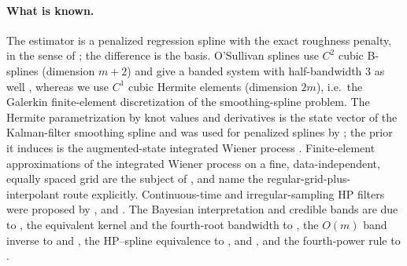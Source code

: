 \documentclass[11pt,a4paper]{article}
\theoremstyle{definition}
\theoremstyle{remark}
\begin{document}
\paragraph{What is known.} The estimator is a penalized regression spline with the exact roughness penalty, in the sense of \citet{OSullivan1986}; the difference is the basis. O'Sullivan splines use $C^2$ cubic B-splines (dimension $m+2$) and give a banded system with half-bandwidth $3$ as well \citep{WandOrmerod2008,Wood2017ps}, whereas we use $C^1$ cubic Hermite elements (dimension $2m$), i.e.\ the Galerkin finite-element discretization of the smoothing-spline problem. The Hermite parametrization by knot values and derivatives is the state vector of the Kalman-filter smoothing spline \citep{WeckerAnsley1983,KohnAnsley1987} and was used for penalized splines by \citet{CostaShaw2009}; the prior it induces is the augmented-state integrated Wiener process \citep{RueHeld2005,LindgrenRue2008}. Finite-element approximations of the integrated Wiener process on a fine, data-independent, equally spaced grid are the subject of \citet{ZhangStringerBrownStafford2024}, and \citet{LindgrenRue2008} name the regular-grid-plus-interpolant route explicitly. Continuous-time and irregular-sampling HP filters were proposed by \citet{IannacconeOtranto2003}, \citet{OtrantoIannaccone2005} and \citet{McElroyTrimbur2007}. The Bayesian interpretation and credible bands are due to \citet{Wahba1978,Wahba1983}, the equivalent kernel and the fourth-root bandwidth to \citet{Silverman1984}, the $O(m)$ band inverse to \citet{TakahashiFaganChin1973} and \citet{HutchinsonDeHoog1985}, the HP--spline equivalence to \citet{Schoenberg1964}, \citet{KingRebelo1993} and \citet{PaigeTrindade2010}, and the fourth-power rule to \citet{RavnUhlig2002}.
\end{document}
